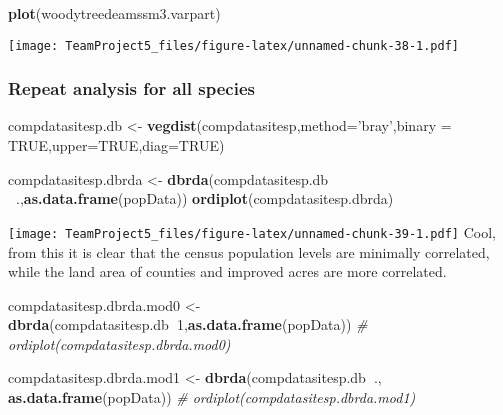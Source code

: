 \documentclass[
]{article}
\newenvironment{Shaded}{\begin{snugshade}}{\end{snugshade}}
\newcommand{\CommentTok}[1]{\textcolor[rgb]{0.56,0.35,0.01}{\textit{#1}}}
\newcommand{\DataTypeTok}[1]{\textcolor[rgb]{0.13,0.29,0.53}{#1}}
\newcommand{\DecValTok}[1]{\textcolor[rgb]{0.00,0.00,0.81}{#1}}
\newcommand{\KeywordTok}[1]{\textcolor[rgb]{0.13,0.29,0.53}{\textbf{#1}}}
\newcommand{\NormalTok}[1]{#1}
\newcommand{\OperatorTok}[1]{\textcolor[rgb]{0.81,0.36,0.00}{\textbf{#1}}}
\newcommand{\OtherTok}[1]{\textcolor[rgb]{0.56,0.35,0.01}{#1}}
\newcommand{\StringTok}[1]{\textcolor[rgb]{0.31,0.60,0.02}{#1}}
\begin{document}
\begin{Shaded}
\begin{Highlighting}[]
\KeywordTok{plot}\NormalTok{(woodytreedeamssm3.varpart)}
\end{Highlighting}
\end{Shaded}

\texttt{[image: TeamProject5\_files/figure-latex/unnamed-chunk-38-1.pdf]}

\hypertarget{repeat-analysis-for-all-species}{%
\subsubsection{Repeat analysis for all
species}\label{repeat-analysis-for-all-species}}

\begin{Shaded}
\begin{Highlighting}[]
\NormalTok{compdatasitesp.db <-}\StringTok{ }\KeywordTok{vegdist}\NormalTok{(compdatasitesp,}\DataTypeTok{method=}\StringTok{'bray'}\NormalTok{,}\DataTypeTok{binary =} \OtherTok{TRUE}\NormalTok{,}\DataTypeTok{upper=}\OtherTok{TRUE}\NormalTok{,}\DataTypeTok{diag=}\OtherTok{TRUE}\NormalTok{)}

\NormalTok{compdatasitesp.dbrda <-}\StringTok{ }\KeywordTok{dbrda}\NormalTok{(compdatasitesp.db }\OperatorTok{~}\NormalTok{.,}\KeywordTok{as.data.frame}\NormalTok{(popData))}
\KeywordTok{ordiplot}\NormalTok{(compdatasitesp.dbrda)}
\end{Highlighting}
\end{Shaded}

\texttt{[image: TeamProject5\_files/figure-latex/unnamed-chunk-39-1.pdf]}
Cool, from this it is clear that the census population levels are
minimally correlated, while the land area of counties and improved acres
are more correlated.

\begin{Shaded}
\begin{Highlighting}[]
\NormalTok{compdatasitesp.dbrda.mod0 <-}\KeywordTok{dbrda}\NormalTok{(compdatasitesp.db}\OperatorTok{~}\DecValTok{1}\NormalTok{,}\KeywordTok{as.data.frame}\NormalTok{(popData))}
\CommentTok{# ordiplot(compdatasitesp.dbrda.mod0)}
\end{Highlighting}
\end{Shaded}

\begin{Shaded}
\begin{Highlighting}[]
\NormalTok{compdatasitesp.dbrda.mod1 <-}\StringTok{ }\KeywordTok{dbrda}\NormalTok{(compdatasitesp.db}\OperatorTok{~}\NormalTok{., }\KeywordTok{as.data.frame}\NormalTok{(popData))}
\CommentTok{# ordiplot(compdatasitesp.dbrda.mod1)}
\end{Highlighting}
\end{Shaded}
\end{document}
